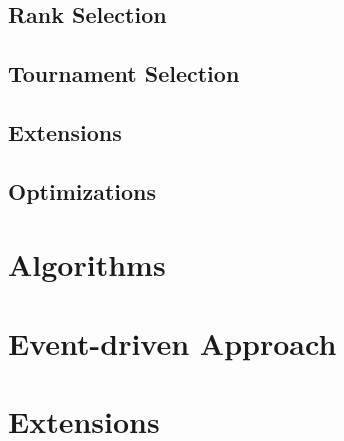 \subsection{Rank Selection}
\todo

\subsection{Tournament Selection}
\todo

\subsection{Extensions}
\todo

\subsection{Optimizations}
\todo

\section{Algorithms}
\todo

\section{Event-driven Approach}
\todo

\section{Extensions}
\todo
